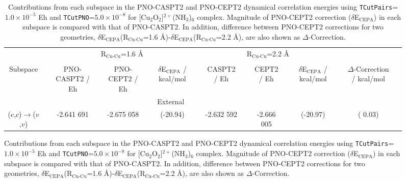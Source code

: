 \documentclass[aip,jcp,amsmath,twocolumn,floatfix,reprint,fleqn]{revtex4-1}
\begin{document}
%
%
%

{
\squeezetable
\begin{figure}    
\begin{longtable}[!ht]{cccccccccccccccc}
  \caption{\label{tab:cu2o2-analysis}
    Contributions from each subspace in the PNO-CASPT2 and PNO-CEPT2 dynamical correlation energies using {\tt TCutPairs}=$1.0\times 10^{-5}$ Eh and {\tt TCutPNO}=$5.0\times 10^{-8}$ for [Cu${}_2$O${}_2$]${}^{2+}$(NH${}_3$)${}_{6}$ complex.
    Magnitude of PNO-CEPT2 correction ($\delta$E${}_\text{CEPA}$) in each subspace is compared with that of PNO-CASPT2.
    In addition, difference between PNO-CEPT2 corrections for two geometries, $\delta$E${}_\text{CEPA}$(R${}_\text{Cu-Cu}$=1.6 \AA)-$\delta$E${}_\text{CEPA}$(R${}_\text{Cu-Cu}$=2.2 \AA), are also shown as $\Delta$-Correction.
}
  \\
\hline  
\hline
 {}                                                               && \multicolumn{5}{c}{R${}_\text{Cu-Cu}$=1.6 \AA} && \multicolumn{5}{c}{R${}_\text{Cu-Cu}$=2.2 \AA} \\
\cline{3-14} \\      
 Subspace                                                         && PNO-CASPT2 / Eh && PNO-CEPT2 / Eh && $\delta$E${}_\text{CEPA}$ / kcal/mol && CASPT2 / Eh && CEPT2 / Eh && $\delta$E${}_\text{CEPA}$ / kcal/mol && $\Delta$-Correction / kcal/mol \\
\hline
                                                                  && \multicolumn{10}{c}{External} \\
($c$,$c$)$\rightarrow$($v$,$v$)                                   && -2.641 691  && -2.675 058  && (-20.94)  && -2.632 592  && -2.666 005  && (-20.97) && (  0.03)\\

\end{longtable}
\end{figure}}
\end{document}
